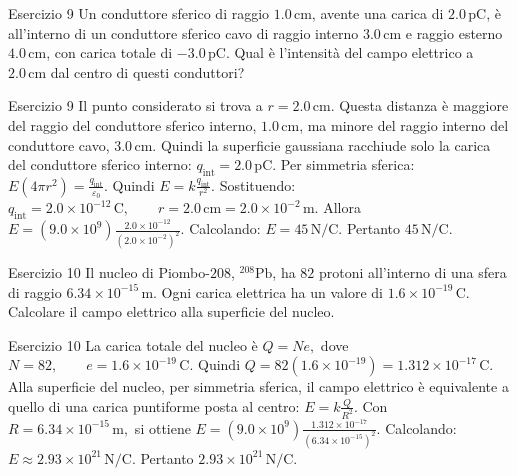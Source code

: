 \documentclass[a4paper]{article}
\begin{document}
\begin{snippetexercise}{Esercizio 9}
    Un conduttore sferico di raggio \(1.0\,\mathrm{cm}\), avente una carica di
    \(2.0\,\mathrm{pC}\), è all'interno di un conduttore sferico cavo di raggio
    interno \(3.0\,\mathrm{cm}\) e raggio esterno \(4.0\,\mathrm{cm}\), con
    carica totale di \(-3.0\,\mathrm{pC}\). Qual è l'intensità del campo
    elettrico a \(2.0\,\mathrm{cm}\) dal centro di questi conduttori?

\end{snippetexercise}
\begin{snippetsolution}{Esercizio 9}
    Il punto considerato si trova a
    \(r = 2.0\,\mathrm{cm}.\)
    Questa distanza è maggiore del raggio del conduttore sferico interno,
    \(1.0\,\mathrm{cm}\), ma minore del raggio interno del conduttore cavo,
    \(3.0\,\mathrm{cm}\). Quindi la superficie gaussiana racchiude solo la
    carica del conduttore sferico interno:
    \(q_{\mathrm{int}} = 2.0\,\mathrm{pC}.\)
    Per simmetria sferica:
    \(E(4\pi r^2) = \frac{q_{\mathrm{int}}}{\varepsilon_0}.\)
    Quindi
    \(E = k\frac{q_{\mathrm{int}}}{r^2}.\)
    Sostituendo:
    \(q_{\mathrm{int}} = 2.0 \times 10^{-12}\,\mathrm{C}, \qquad r = 2.0\,\mathrm{cm} = 2.0 \times 10^{-2}\,\mathrm{m}.\)
    Allora
    \(E = \left(9.0 \times 10^9\right) \frac{2.0 \times 10^{-12}} {\left(2.0 \times 10^{-2}\right)^2}.\)
    Calcolando:
    \(E = 45\,\mathrm{N/C}.\)
    Pertanto
    \(\boxed{45\,\mathrm{N/C}}.\)
\end{snippetsolution}
\begin{snippetexercise}{Esercizio 10}
    Il nucleo di Piombo-\(208\), \({}^{208}\mathrm{Pb}\), ha \(82\) protoni
    all'interno di una sfera di raggio
    \(6.34 \times 10^{-15}\,\mathrm{m}\). Ogni carica elettrica ha un valore di
    \(1.6 \times 10^{-19}\,\mathrm{C}\). Calcolare il campo elettrico alla
    superficie del nucleo.

\end{snippetexercise}
\begin{snippetsolution}{Esercizio 10}
    La carica totale del nucleo è
    \(Q = Ne,\)
    dove
    \(N = 82, \qquad e = 1.6 \times 10^{-19}\,\mathrm{C}.\)
    Quindi
    \(Q = 82 \left(1.6 \times 10^{-19}\right) = 1.312 \times 10^{-17}\,\mathrm{C}.\)
    Alla superficie del nucleo, per simmetria sferica, il campo elettrico è
    equivalente a quello di una carica puntiforme posta al centro:
    \(E = k\frac{Q}{R^2}.\)
    Con
    \(R = 6.34 \times 10^{-15}\,\mathrm{m},\)
    si ottiene
    \(E = \left(9.0 \times 10^9\right) \frac{ 1.312 \times 10^{-17} }{ \left(6.34 \times 10^{-15}\right)^2 }.\)
    Calcolando:
    \(E \approx 2.93 \times 10^{21}\,\mathrm{N/C}.\)
    Pertanto
    \(\boxed{2.93 \times 10^{21}\,\mathrm{N/C}}.\)
\end{snippetsolution}
\pagebreak
\end{document}
